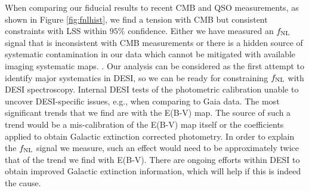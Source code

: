 When comparing our fiducial results to recent CMB and QSO measurements, as shown in Figure \ref{fig:fnlhist}, we find a  tension with CMB but consistent constraints with LSS within $95\%$ confidence. Either we have measured an $f_{\rm NL}$ signal that is inconsistent with CMB measurements or there is a hidden source of systematic contamination in our data which cannot be mitigated with available imaging systematic maps. . Our analysis can be considered as the first attempt to identify major systematics in DESI, so we can be ready for constraining $f_{\rm NL}$ with DESI spectroscopy. Internal DESI tests of the photometric calibration  unable to uncover DESI-specific issues, e.g., when comparing to Gaia data. The most significant trends that we find are with the E(B-V) map. The source of such a trend would be a mis-calibration of the E(B-V) map itself or the coefficients applied to obtain Galactic extinction corrected photometry.  In order to explain the $f_{\rm NL}$ signal we measure, such an effect would need to be approximately twice that of the trend we find with E(B-V). There are ongoing efforts within DESI to obtain improved Galactic extinction information, which will help  if this is indeed the cause.





